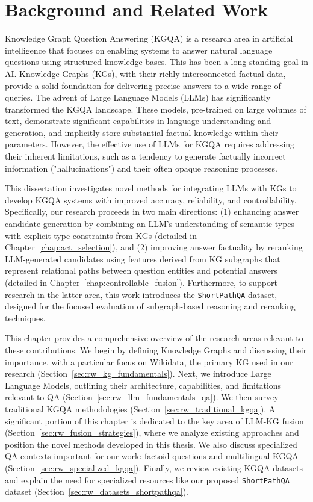 \chapter{Background and Related Work}
\label{chap:related_work}

Knowledge Graph Question Answering (KGQA) is a research area in artificial intelligence that focuses on enabling systems to answer natural language questions using structured knowledge bases. This has been a long-standing goal in AI. Knowledge Graphs (KGs), with their richly interconnected factual data, provide a solid foundation for delivering precise answers to a wide range of queries. The advent of Large Language Models (LLMs) has significantly transformed the KGQA landscape. These models, pre-trained on large volumes of text, demonstrate significant capabilities in language understanding and generation, and implicitly store substantial factual knowledge within their parameters. However, the effective use of LLMs for KGQA requires addressing their inherent limitations, such as a tendency to generate factually incorrect information ("hallucinations") and their often opaque reasoning processes.

This dissertation investigates novel methods for integrating LLMs with KGs to develop KGQA systems with improved accuracy, reliability, and controllability. Specifically, our research proceeds in two main directions: (1) enhancing answer candidate generation by combining an LLM's understanding of semantic types with explicit type constraints from KGs (detailed in Chapter~\ref{chap:act_selection}), and (2) improving answer factuality by reranking LLM-generated candidates using features derived from KG subgraphs that represent relational paths between question entities and potential answers (detailed in Chapter~\ref{chap:controllable_fusion}). Furthermore, to support research in the latter area, this work introduces the \texttt{ShortPathQA} dataset, designed for the focused evaluation of subgraph-based reasoning and reranking techniques.

This chapter provides a comprehensive overview of the research areas relevant to these contributions. We begin by defining Knowledge Graphs and discussing their importance, with a particular focus on Wikidata, the primary KG used in our research (Section~\ref{sec:rw_kg_fundamentals}). Next, we introduce Large Language Models, outlining their architecture, capabilities, and limitations relevant to QA (Section~\ref{sec:rw_llm_fundamentals_qa}). We then survey traditional KGQA methodologies (Section~\ref{sec:rw_traditional_kgqa}). A significant portion of this chapter is dedicated to the key area of LLM-KG fusion (Section~\ref{sec:rw_fusion_strategies}), where we analyze existing approaches and position the novel methods developed in this thesis. We also discuss specialized QA contexts important for our work: factoid questions and multilingual KGQA (Section~\ref{sec:rw_specialized_kgqa}). Finally, we review existing KGQA datasets and explain the need for specialized resources like our proposed \texttt{ShortPathQA} dataset (Section~\ref{sec:rw_datasets_shortpathqa}).


